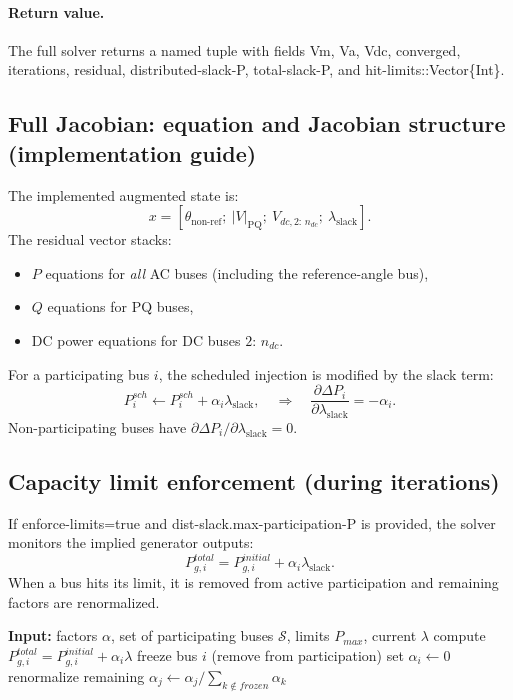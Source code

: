 \documentclass[11pt]{article}
\def\code#1{#1}%
\def\_{-}%
\newcommand{\code}[1]{\nolinkurl{#1}}
\begin{document}
\paragraph{Return value.}
The full solver returns a named tuple with fields
\code{Vm}, \code{Va}, \code{Vdc}, \code{converged}, \code{iterations}, \code{residual},
\code{distributed\_slack\_P}, \code{total\_slack\_P}, and \code{hit\_limits::Vector\{Int\}}.

\subsection{Full Jacobian: equation and Jacobian structure (implementation guide)}
The implemented augmented state is:
\[
x = [\theta_{\text{non-ref}};\ |V|_{\text{PQ}};\ V_{dc,2:\,n_{dc}};\ \lambda_{\text{slack}}].
\]
The residual vector stacks:
\begin{itemize}[leftmargin=*]
  \item $P$ equations for \emph{all} AC buses (including the reference-angle bus),
  \item $Q$ equations for PQ buses,
  \item DC power equations for DC buses $2:\,n_{dc}$.
\end{itemize}

For a participating bus $i$, the scheduled injection is modified by the slack term:
\[
P^{sch}_i \leftarrow P^{sch}_i + \alpha_i \lambda_{\text{slack}},
\quad\Rightarrow\quad
\frac{\partial \Delta P_i}{\partial \lambda_{\text{slack}}} = -\alpha_i.
\]
Non-participating buses have $\partial \Delta P_i/\partial \lambda_{\text{slack}} = 0$.

\subsection{Capacity limit enforcement (during iterations)}
If \code{enforce\_limits=true} and \code{dist\_slack.max\_participation\_P} is provided, the solver monitors the implied generator outputs:
\[
P_{g,i}^{total} = P_{g,i}^{initial} + \alpha_i \lambda_{\text{slack}}.
\]
When a bus hits its limit, it is removed from active participation and remaining factors are renormalized.

\begin{algorithm}
\caption{Capacity Enforcement for Full Distributed Slack}
\begin{algorithmic}[1]
\STATE \textbf{Input:} factors $\alpha$, set of participating buses $\mathcal{S}$, limits $P_{max}$, current $\lambda$
  \STATE compute $P^{total}_{g,i} = P^{initial}_{g,i} + \alpha_i \lambda$
    \STATE freeze bus $i$ (remove from participation)
    \STATE set $\alpha_i \leftarrow 0$
    \STATE renormalize remaining $\alpha_j \leftarrow \alpha_j / \sum_{k \notin frozen}\alpha_k$
  \ENDIF
\ENDFOR
\end{algorithmic}
\end{algorithm}
\end{document}
